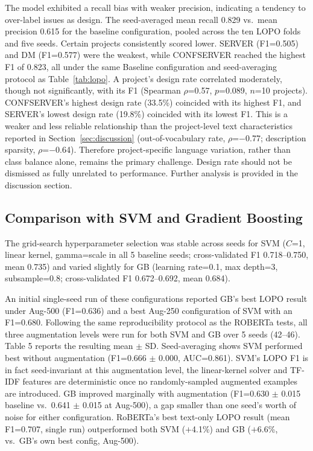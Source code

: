 \documentclass[preprint,12pt]{elsarticle}
\begin{document}
The model exhibited a recall bias with weaker precision, indicating a tendency to over-label issues as design. The seed-averaged mean recall 0.829 vs.\ mean precision 0.615 for the baseline configuration, pooled across the ten LOPO folds and five seeds. Certain projects consistently scored lower. SERVER (F1=0.505) and DM (F1=0.577) were the weakest, while CONFSERVER reached the highest F1 of 0.823, all under the same Baseline configuration and seed-averaging protocol as Table~\ref{tab:lopo}. A project's design rate correlated moderately, though not significantly, with its F1 (Spearman $\rho$=0.57, $p$=0.089, $n$=10 projects). CONFSERVER's highest design rate (33.5\%) coincided with its highest F1, and SERVER's lowest design rate (19.8\%) coincided with its lowest F1. This is a weaker and less reliable relationship than the project-level text characteristics reported in Section~\ref{sec:discussion} (out-of-vocabulary rate, $\rho$=$-$0.77; description sparsity, $\rho$=$-$0.64). Therefore project-specific language variation, rather than class balance alone, remains the primary challenge. Design rate should not be dismissed as fully unrelated to performance. Further analysis is provided in the discussion section.

\subsection{Comparison with SVM and Gradient Boosting}

The grid-search hyperparameter selection was stable across seeds for SVM ($C$=1, linear kernel, gamma=scale in all 5 baseline seeds; cross-validated F1 0.718--0.750, mean 0.735) and varied slightly for GB (learning rate=0.1, max depth=3, subsample=0.8; cross-validated F1 0.672--0.692, mean 0.684).

An initial single-seed run of these configurations reported GB's best LOPO result under Aug-500 (F1=0.636) and a best Aug-250 configuration of SVM with an F1=0.680. Following the same reproducibility protocol as the ROBERTa tests, all three augmentation levels were run for both SVM and GB over 5 seeds (42--46). Table 5 reports the resulting mean $\pm$ SD. Seed-averaging shows SVM performed best without augmentation (F1=0.666 $\pm$ 0.000, AUC=0.861). SVM's LOPO F1 is in fact seed-invariant at this augmentation level, the linear-kernel solver and TF-IDF features are deterministic once no randomly-sampled augmented examples are introduced. GB improved marginally with augmentation (F1=0.630 $\pm$ 0.015 baseline vs.\ 0.641 $\pm$ 0.015 at Aug-500), a gap smaller than one seed's worth of noise for either configuration. RoBERTa's best text-only LOPO result (mean F1=0.707, single run) outperformed both SVM ($+$4.1\%) and GB ($+$6.6\%, vs.\ GB's own best config, Aug-500).
\end{document}
